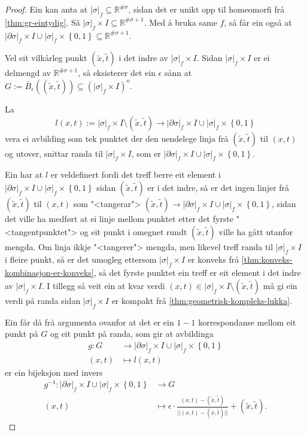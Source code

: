 \documentclass[a4paper, 12pt, norsk]{article}
\theoremstyle{plain}
\theoremstyle{definition}
\newcommand{\Rb}{\mathbb{R}}
\newcommand{\union}{ \mathop{\cup}\limits }
\newcommand{\gr}[1]{ \lvert #1 \rvert } %
\newcommand{\set}[1]{ \left\{ #1 \right\} } %
\newcommand{\tuple}[1]{ \left( #1 \right) } %
\begin{document}
\begin{proof}
	Ein kan anta at \( \gr{\sigma}_f \subseteq \Rb^{\#\sigma} \), sidan det er unikt opp til homeomorfi frå \autoref{thm:gr-eintydig}. Så \( \gr{\sigma}_f \times I \subseteq \Rb^{\#\sigma+1} \). Med å bruka same \( f \), så får ein også at \( \gr{\partial\sigma}_f \times I \union \gr{\sigma}_f \times \set{0, 1} \subseteq \Rb^{\#\sigma+1} \).

	Vel eit vilkårleg punkt \( \tuple{\tilde{x}, \tilde{t}} \) i det indre av \( \gr{\sigma}_f \times I \). Sidan \( \gr{\sigma}_f \times I \) er ei delmengd av \( \Rb^{\#\sigma+1} \), så eksisterer det ein \( \epsilon \) sånn at \( G := \bar{B}_{\epsilon}\tuple{\tuple{\tilde{x}, \tilde{t}}} \subseteq \tuple{\gr{\sigma}_f \times I}^o \).
	
	La
	\[
		l(x,t) := \gr{\sigma}_f \times I \setminus \tuple{\tilde{x}, \tilde{t}} \to \gr{\partial\sigma}_f \times I \union \gr{\sigma}_f \times \set{0, 1}
	\] 
	vera ei avbilding som tek punktet der den uendelege linja frå \( \tuple{\tilde{x}, \tilde{t}} \) til \( \tuple{x,t} \) og utover, snittar randa til \( \gr{\sigma}_f \times I \), som er \( \gr{\partial\sigma}_f \times I \union \gr{\sigma}_f \times \set{0, 1} \).

	Ein har at \( l \) er veldefinert fordi det treff berre eit element i \( \gr{\partial\sigma}_f \times I \union \gr{\sigma}_f \times \set{0, 1} \) sidan \( \tuple{\tilde{x}, \tilde{t}} \) er i det indre, så er det ingen linjer frå \( \tuple{\tilde{x}, \tilde{t}} \) til \( \tuple{x,t} \) som "<tangerar"> \( \tuple{\tilde{x}, \tilde{t}} \to \gr{\partial\sigma}_f \times I \union \gr{\sigma}_f \times \set{0, 1} \), sidan det ville ha medført at ei linje mellom punktet etter det fyrste "<tangentpunktet"> og eit punkt i omegnet rundt \( \tuple{\tilde{x}, \tilde{t}} \) ville ha gått utanfor mengda. Om linja ikkje "<tangerer"> mengda, men likevel treff randa til \( \gr{\sigma}_f \times I \) i fleire punkt, så er det umogleg ettersom \( \gr{\sigma}_f \times I \) er konveks frå \autoref{thm:konveks-kombinasjon-er-konveks}, så det fyrste punktet ein treff er eit element i det indre av \( \gr{\sigma}_f \times I \). I tillegg så veit ein at kvar verdi \( (x,t) \in \gr{\sigma}_f \times I \setminus \tuple{\tilde{x}, \tilde{t}} \) må gi ein verdi på randa sidan \( \gr{\sigma}_f \times I \) er kompakt frå \autoref{thm:geometrisk-kompleks-lukka}.

	Ein får då frå argumenta ovanfor at det er ein \( 1 - 1 \) korrespondanse mellom eit punkt på \( G \) og eit punkt på randa, som gir at avbildinga
	\begin{align*}
		g: G &\to \gr{\partial\sigma}_f \times I \union \gr{\sigma}_f \times \set{0, 1} \\
		(x, t) &\mapsto l(x,t)
	\end{align*}
	er ein bijeksjon med invers
	\begin{align*}
		g^{-1}: \gr{\partial\sigma}_f \times I \union \gr{\sigma}_f \times \set{0, 1} &\to G \\
		(x, t) &\mapsto \epsilon\cdot\frac{(x,t)-\tuple{\tilde{x}, \tilde{t}}}{||(x,t)-\tuple{\tilde{x}, \tilde{t}}||} + \tuple{\tilde{x}, \tilde{t}}.
	\end{align*}
	

\end{proof}
\end{document}
